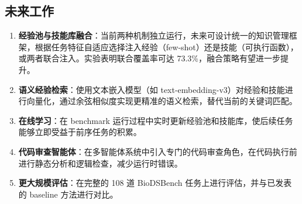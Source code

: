 \subsection{未来工作}

\begin{enumerate}
    \item \textbf{经验池与技能库融合}：当前两种机制独立运行，未来可设计统一的知识管理框架，根据任务特征自适应选择注入经验（few-shot）还是技能（可执行函数），或两者联合注入。实验表明联合覆盖率可达 73.3\%，融合策略有望进一步提升。
    \item \textbf{语义经验检索}：使用文本嵌入模型（如 text-embedding-v3）对经验和技能进行向量化，通过余弦相似度实现更精准的语义检索，替代当前的关键词匹配。
    \item \textbf{在线学习}：在 benchmark 运行过程中实时更新经验池和技能库，使后续任务能够立即受益于前序任务的积累。
    \item \textbf{代码审查智能体}：在多智能体系统中引入专门的代码审查角色，在代码执行前进行静态分析和逻辑检查，减少运行时错误。
    \item \textbf{更大规模评估}：在完整的 108 道 BioDSBench 任务上进行评估，并与已发表的 baseline 方法进行对比。
\end{enumerate}
